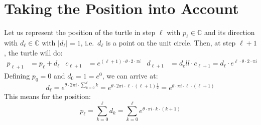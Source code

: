 \documentclass[pdftex,a4paper]{scrartcl}
\begin{document}
\section{Taking the Position into Account}
Let us represent the position of the turtle in step \(\ell\) with \(p_\ell\in\mathbb{C}\) and its direction with
\(d_\ell\in\mathbb{C}\) with \(|d_\ell|=1\), i.e.\ \(d_\ell\) is a point on the unit circle. Then, at step \(\ell+1\), the turtle
will do:
\begin{align*}
p_{\ell+1} &= p_\ell + d_\ell &
c_{\ell+1} &= e^{(\ell+1)\cdot \theta\cdot 2\cdot \pi i} &
d_{\ell+1} &= d_ell\cdot c_{\ell+1} = d_\ell \cdot e^{\ell\cdot \theta\cdot 2\cdot \pi i}
\end{align*}
Defining \(p_0=0\) and \(d_0=1=e^0\), we can arrive at:
\[
d_\ell = e^{\theta\cdot 2\pi i\cdot \sum_{k=0}^\ell k}
= e^{\theta\cdot 2\pi i \cdot \ell\cdot(\ell+1)\frac{1}{2}}
= e^{\theta\cdot \pi i \cdot \ell\cdot(\ell+1)}
\]
This means for the position:
\[
p_\ell = \sum_{k=0}^\ell d_k
= \sum_{k=0}^\ell e^{\theta\cdot \pi i\cdot k\cdot(k+1)}
\]
\end{document}
